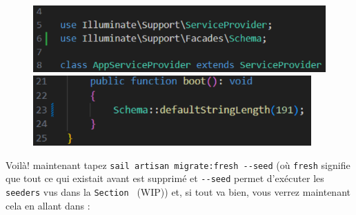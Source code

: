 \begin{figure}[!h]
    \centering
    \begin{minipage}{0.49\textwidth}
         \centering
         \includegraphics[width=\textwidth]{figures-C1/appservice_2.pdf}
    \end{minipage}
    \begin{minipage}{0.49\textwidth}
         \centering
         \includegraphics[width=0.95\textwidth]{figures-C1/appservice_1.pdf}
    \end{minipage}
\end{figure}

Voilà! maintenant tapez \verb|sail artisan migrate:fresh --seed| (où \verb|fresh| signifie que tout ce qui existait avant est supprimé et \verb|--seed| permet d'exécuter les \texttt{seeders} vus dans la \texttt{Section~} (WIP)) et, si tout va bien, vous verrez maintenant cela en allant dans \phpmyadmin{}:

